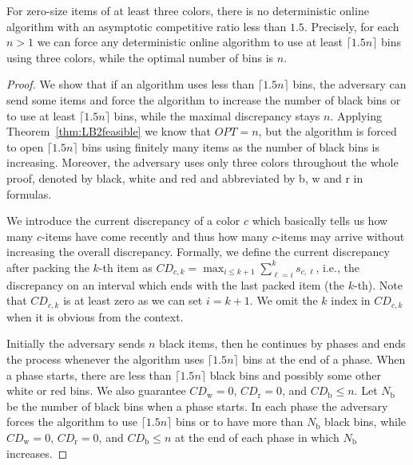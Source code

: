\documentclass[11pt,a4paper]{article}
\def\vari#1{\mathit{#1}}
\begin{document}
\begin{theorem}
\label{thm:LBforColors}
For zero-size items of at least three colors,
there is no deterministic online algorithm with an asymptotic competitive ratio less than $1.5$.
Precisely, for each $n>1$ we can force any deterministic online algorithm to use at least $\lceil 1.5n \rceil$ bins using three colors,
while the optimal number of bins is $n$.
\end{theorem}

\begin{proof}
We show that if an algorithm uses less than $\lceil 1.5n \rceil$ bins,
the adversary can send some items and force the algorithm to increase the
number of black bins or to use at least $\lceil 1.5n \rceil$ bins,
while the maximal discrepancy stays $n$.
Applying Theorem~\ref{thm:LB2feasible} we know that $\vari{OPT} = n$,
but the algorithm is forced to open $\lceil 1.5n \rceil$ bins using
finitely many items as the number of black bins is increasing.
Moreover, the adversary uses only three colors throughout the whole proof, denoted by black, white and red
and abbreviated by b, w and r in formulas.

We introduce the current discrepancy of a color $c$ which basically tells us how many $c$-items
have come recently and thus how many $c$-items may arrive without increasing the overall discrepancy.
Formally, we define the current discrepancy after packing the $k$-th item as
$\vari{CD}_{c,k} = \max_{i \leq k+1} \sum_{\ell=i}^k s_{c,\ell}$,
i.e., the discrepancy on an interval which ends with the last packed item (the $k$-th).
Note that $\vari{CD}_{c,k}$ is at least zero as we can set $i = k+1$.
We omit the $k$ index in $\vari{CD}_{c,k}$ when it is obvious from the context.

Initially the adversary sends $n$ black items, then he continues by phases and
ends the process whenever the algorithm uses $\lceil 1.5n \rceil$ bins at the end of a phase.
When a phase starts, there are less than $\lceil 1.5n \rceil$
black bins and possibly some other white or red bins.
We also guarantee $\vari{CD}_{\mathrm{w}} = 0$,
$\vari{CD}_{\mathrm{r}} = 0$, and $\vari{CD}_{\mathrm{b}} \leq n$. 
Let $N_{\mathrm{b}}$ be the number of black bins when a phase starts.
In each phase the adversary forces the algorithm to use $\lceil 1.5n \rceil$ bins
or to have more than $N_{\mathrm{b}}$ black bins,
while $\vari{CD}_{\mathrm{w}} = 0$, $\vari{CD}_{\mathrm{r}} = 0$, and
$\vari{CD}_{\mathrm{b}} \leq n$ at the end of each phase in which $N_{\mathrm{b}}$ increases.


\end{proof}
\end{document}
